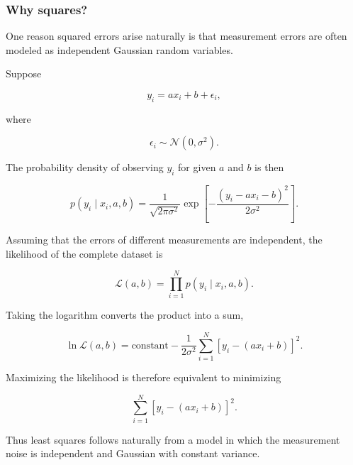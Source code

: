 \subsubsection{Why squares?}

One reason squared errors arise naturally is that measurement errors are often modeled as independent Gaussian random variables.

Suppose

\begin{equation}
    y_i=ax_i+b+\epsilon_i,
\end{equation}

where

\begin{equation}
    \epsilon_i\sim\mathcal{N}(0,\sigma^2).
\end{equation}

The probability density of observing $y_i$ for given $a$ and $b$ is then

\begin{equation}
    p(y_i\mid x_i,a,b)=\frac{1}{\sqrt{2\pi\sigma^2}}\exp\left[-\frac{\left(y_i-ax_i-b\right)^2}{2\sigma^2}\right].
\end{equation}

Assuming that the errors of different measurements are independent, the likelihood of the complete dataset is

\begin{equation}
    \mathcal{L}(a,b)=\prod_{i=1}^{N}p(y_i\mid x_i,a,b).
\end{equation}

Taking the logarithm converts the product into a sum,

\begin{equation}
    \ln\mathcal{L}(a,b)=\text{constant}-\frac{1}{2\sigma^2}\sum_{i=1}^{N}\left[y_i-(ax_i+b)\right]^2.
\end{equation}

Maximizing the likelihood is therefore equivalent to minimizing

\begin{equation}
    \sum_{i=1}^{N}\left[y_i-(ax_i+b)\right]^2.
\end{equation}

Thus least squares follows naturally from a model in which the measurement noise is independent and Gaussian with constant variance.


